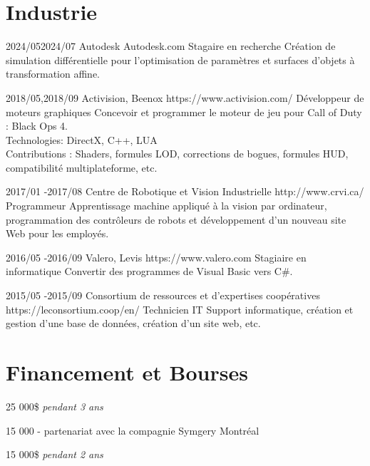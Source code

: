 \documentclass[10pt]{article} %
\begin{document}
\section{Industrie}

\job
{2024/05}{2024/07}
{Autodesk}
{Autodesk.com}
{Stagaire en recherche}
{Création de simulation différentielle pour l'optimisation de paramètres et surfaces d'objets à transformation affine.}


\job
{2018/05,}{2018/09}
{Activision, Beenox}
{https://www.activision.com/}
{Développeur de moteurs graphiques}
{Concevoir et programmer le moteur de jeu pour Call of Duty : Black Ops 4.\\
 Technologies: DirectX, C++, LUA \\
 Contributions : Shaders, formules LOD, corrections de bogues, formules HUD, compatibilité multiplateforme, etc.}


\job
{2017/01 -}{2017/08}
{Centre de Robotique et Vision Industrielle}
{http://www.crvi.ca/}
{Programmeur}
{Apprentissage machine appliqué à la vision par ordinateur, programmation des contrôleurs de robots et développement d'un nouveau
site Web pour les employés.}

\job
{2016/05 -}{2016/09}
{Valero, Levis}
{https://www.valero.com}
{Stagiaire en informatique}
{Convertir des programmes de Visual Basic vers C\#.}

\job
{2015/05 -}{2015/09}
{Consortium de ressources et d'expertises coopératives}
{https://leconsortium.coop/en/}
{Technicien IT}
{Support informatique, création et gestion d'une base de données, création d'un site web, etc.}


\section{Financement et Bourses}

{
 25 000\$  \textit{pendant 3 ans}\\
}

{
 15 000 - partenariat avec la compagnie Symgery Montréal\\
}

{
 15 000\$ \textit{pendant 2 ans} \\
}
\end{document}
